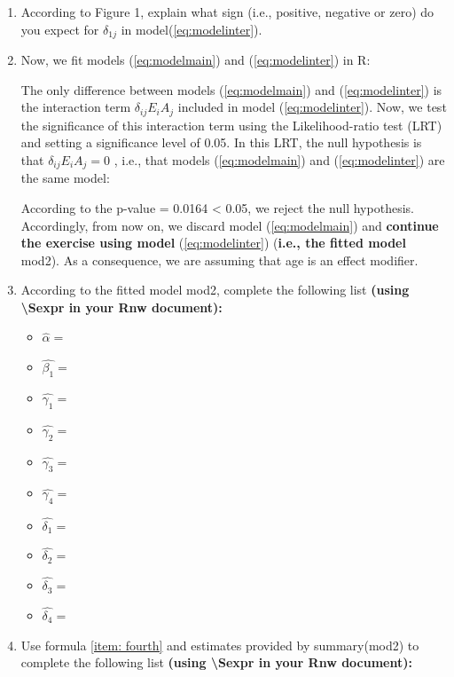 \documentclass[10pt,a4paper,twoside]{article}\usepackage[]{graphicx}\usepackage[]{xcolor}
\begin{document}
\begin{enumerate}
\item \label{item: fourth} According to Figure 1, explain what sign (i.e., positive, negative or zero) do you expect for $\delta_{1j}$ in model(\ref{eq:modelinter}).
\item Now, we fit models (\ref{eq:modelmain}) and (\ref{eq:modelinter}) in R:

The only difference between models (\ref{eq:modelmain}) and (\ref{eq:modelinter}) is the interaction term $\delta_{ij}E_{i}A_{j}$
included in model (\ref{eq:modelinter}). Now, we test the significance of this interaction term using
the Likelihood-ratio test (LRT) and setting a significance level of 0.05. In this LRT,
the null hypothesis is that $\delta_{ij}E_{i}A_{j} = 0$ , i.e., that models (\ref{eq:modelmain}) and (\ref{eq:modelinter}) are the same model:

According to the p-value = 0.0164 < 0.05, we reject the null hypothesis. Accordingly, from now on, we discard model (\ref{eq:modelmain}) and \textbf{continue the exercise using model} (\ref{eq:modelinter}) (\textbf{i.e., the fitted model} mod2). As a consequence, we are assuming that age is an
effect modifier.

\item According to the fitted model mod2, complete the following list \textbf{(using \textbackslash{Sexpr} in your Rnw document):}
\begin{itemize}
    \item $\hat{\alpha}=$
    \item $\hat{\beta_{1}} =$
    \item $\hat{\gamma_{1}} =$
    \item $\hat{\gamma_{2}}=$
    \item $\hat{\gamma_{3}}=$
    \item $\hat{\gamma_{4}}=$
    \item $\hat{\delta_{1}}=$
    \item $\hat{\delta_{2}}=$
    \item $\hat{\delta_{3}}=$
    \item $\hat{\delta_{4}}=$
\end{itemize}
    \item Use formula \ref{item: fourth} and estimates provided by summary(mod2) to complete the following list \textbf{(using \textbackslash{Sexpr} in your Rnw document):}

\end{enumerate}
\end{document}
